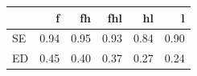 \begin{tabular}{lrrrrr}
\toprule
 & f & fh & fhl & hl & l \\
\midrule
SE & 0.94 & 0.95 & 0.93 & 0.84 & 0.90 \\
ED & 0.45 & 0.40 & 0.37 & 0.27 & 0.24 \\
\bottomrule
\end{tabular}
